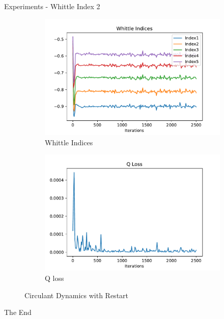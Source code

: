 \documentclass{beamer}
\begin{document}
\begin{frame}{Experiments - Whittle Index 2}
    \begin{figure}[H]
     \captionsetup[subfigure]{justification=centering}
     \centering
     \begin{subfigure}{0.48\linewidth}
         \centering
         \includegraphics[width=1\linewidth]{Indices.pdf}
         \caption{Whittle Indices}
         \label{Whittle Indices 2}
     \end{subfigure}
     \begin{subfigure}{0.48\linewidth}
         \centering
         \includegraphics[width=1\linewidth]{Q Loss1.pdf}
         \caption{Q loss}
         \label{}
     \end{subfigure}
     \caption{Circulant Dynamics with Restart}
\end{figure}
\end{frame}
\begin{frame}
\Huge{\centerline{The End}}
\end{frame}

\end{document}
